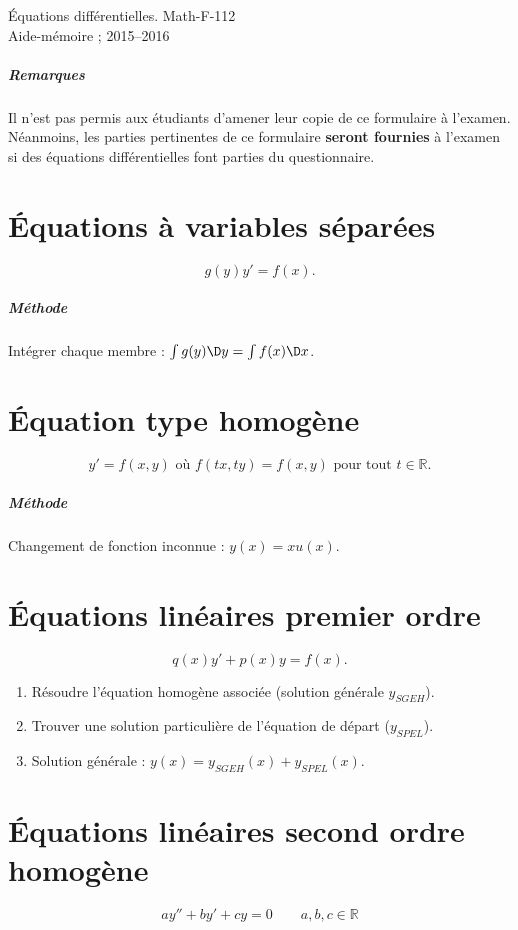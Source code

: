 \documentclass[french,oneside,twocolumn,article]{memoir} %
\newcommand*{\ens}[1]{\mathbb{#1}} %
\newcommand*{\RR}{\ens R}%
\def\methode{\paragraph{Méthode}}
\begin{document}
\begin{center}
  Équations différentielles. Math-F-112\\
  Aide-mémoire ;  2015--2016
\end{center}

\paragraph{Remarques}
Il n'est pas permis aux étudiants d'amener leur copie de ce formulaire à l'examen. Néanmoins, les parties pertinentes de ce formulaire \textbf{seront fournies} à l'examen si des équations différentielles font parties du questionnaire.
\chapter{Équations à variables séparées}
\begin{equation*}
  g(y) y' = f(x).
\end{equation*}

\methode{} Intégrer chaque membre : $\int g(y)\D y = \int f(x) \D x$.

\chapter{Équation type homogène}
\begin{equation*}
  y' = f(x,y) \text{ où $f(tx,ty) = f(x,y)$ pour tout $t \in \RR$.}
\end{equation*}

\methode{} Changement de fonction inconnue : \(y(x) = x u(x)\).

\chapter{Équations linéaires premier ordre}
\begin{equation*}
  q(x) y' +  p(x) y = f(x) \tag{EL}.
\end{equation*}

\begin{enumerate}
\item Résoudre l'équation homogène associée (solution générale $y_{SGEH}$).
\item Trouver une solution particulière de l'équation de départ ($y_{SPEL}$).
\item Solution générale : $y(x) = y_{SGEH}(x) + y_{SPEL}(x)$.
\end{enumerate}
\chapter{Équations linéaires second ordre homogène}
\label{second-ordre-lin-homogene}
\begin{equation*}
  a y'' + by' + cy = 0 \qquad a,b,c\in \RR
\end{equation*}
\end{document}
